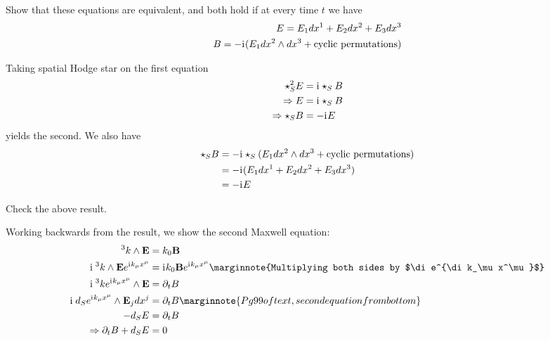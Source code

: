 \documentclass[10pt]{article}
\begin{document}
\begin{example}
	Show that these equations are equivalent, and both hold if at every time $t$ we have
	$$
		\begin{aligned}
			E = E_1dx^1 + E_2dx^2 + E_3dx^3\\
			B = -\mathrm{i}\mkern1mu(E_1dx^2 \wedge dx^3 + \text{cyclic permutations})
		\end{aligned}
	$$
\end{example}
\sol Taking spatial Hodge star on the first equation
$$
\begin{aligned}
	\star_S^2E &= \mathrm{i}\mkern1mu \star_SB\\
	\Rightarrow E &= \mathrm{i}\mkern1mu\star_SB\\
	\Rightarrow \star_SB &= -\mathrm{i}\mkern1mu E
\end{aligned}
$$
yields the second. We also have
$$
\begin{aligned}
	\star_SB &= -\mathrm{i}\mkern1mu\star_S(E_1dx^2 \wedge dx^3 + \text{cyclic permutations})\\
	&= -\mathrm{i}\mkern1mu (E_1dx^1 + E_2dx^2 + E_3dx^3)\\
	&= -\mathrm{i}\mkern1mu E
\end{aligned}
$$


\begin{example}
	Check the above result.
\end{example}
\sol Working backwards from the result, we show the second Maxwell equation:
$$
\begin{aligned}
	^3k\wedge {\bf E} &= k_0 {\bf B}\\
	\di \:^3k \wedge {\bf E} e^{\di k_\mu x^\mu} &= \di k_0 {\bf B} e^{\di k_\mu x^\mu} \marginnote{Multiplying both sides by $\di e^{\di k_\mu x^\mu}$}\\
	\di \:^3k e^{\di k_\mu x^\mu} \wedge {\bf E} &= \partial_tB\\
	\di \:d_S e^{\di k_\mu x^\mu} \wedge {\bf E}_j dx^j &= \partial_tB\marginnote{Pg 99 of text, second equation from bottom}\\
	-d_S E &= \partial_tB\\
	\Rightarrow \partial_tB + d_S E &= 0\\
\end{aligned}
$$
\end{document}
